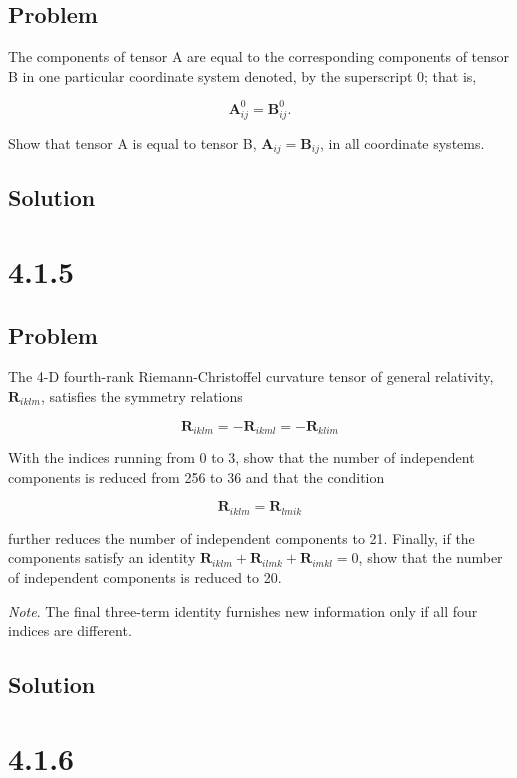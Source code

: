 \documentclass[12pt]{article}
\begin{document}
\subsection{Problem}

The components of tensor A are equal to the corresponding components of tensor B in
one particular coordinate system denoted, by the superscript 0; that is,

\[
    \textbf{A}^0_{ij} = \textbf{B}^0_{ij}.
\]

Show that tensor A is equal to tensor B, \(\textbf{A}_{ij} = \textbf{B}_{ij}\), in all
coordinate systems.

\subsection{Solution}

\section{4.1.5}

\subsection{Problem}

The 4-D fourth-rank Riemann-Christoffel curvature tensor of general relativity,
\(\textbf{R}_{iklm}\), satisfies the symmetry relations

\[
    \textbf{R}_{iklm} = - \textbf{R}_{ikml} = - \textbf{R}_{klim}
\]

With the indices running from 0 to 3, show that the number of independent components
is reduced from 256 to 36 and that the condition

\[
    \textbf{R}_{iklm} = \textbf{R}_{lmik}
\]

further reduces the number of independent components to 21. Finally, if the components
satisfy an identity \(\textbf{R}_{iklm} + \textbf{R}_{ilmk} + \textbf{R}_{imkl} = 0\),
show that the number of independent components is reduced to 20.

\textit{Note}. The final three-term identity furnishes new
information only if all four indices are different.

\subsection{Solution}

\section{4.1.6}
\end{document}
